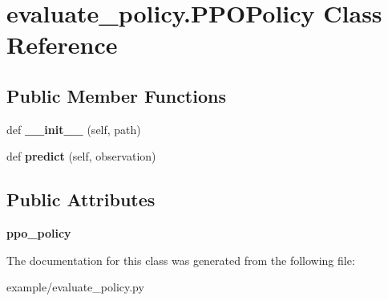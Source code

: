 \hypertarget{classevaluate__policy_1_1PPOPolicy}{}\section{evaluate\+\_\+policy.\+P\+P\+O\+Policy Class Reference}
\label{classevaluate__policy_1_1PPOPolicy}
\subsection*{Public Member Functions}
\begin{DoxyCompactItemize}
\item 
\mbox{\label{classevaluate__policy_1_1PPOPolicy_affd7aad66b64999b11f9c406eefe1cfb}} 
def {\bfseries \+\_\+\+\_\+init\+\_\+\+\_\+} (self, path)
\item 
\mbox{\label{classevaluate__policy_1_1PPOPolicy_ae4ae1dea8f4b7b0a8e6e39e85b456066}} 
def {\bfseries predict} (self, observation)
\end{DoxyCompactItemize}
\subsection*{Public Attributes}
\begin{DoxyCompactItemize}
\item 
\mbox{\label{classevaluate__policy_1_1PPOPolicy_a8d4650b85dad2525dbc7dd6fd34b61ee}} 
{\bfseries ppo\+\_\+policy}
\end{DoxyCompactItemize}


The documentation for this class was generated from the following file\+:\begin{DoxyCompactItemize}
\item 
example/evaluate\+\_\+policy.\+py\end{DoxyCompactItemize}
